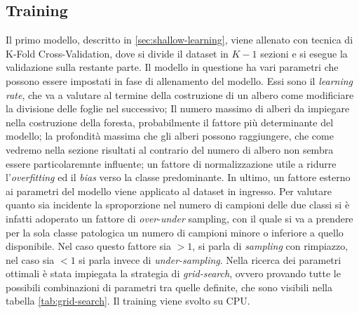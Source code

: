 \subsection{Training}

Il primo modello, descritto in \ref{sec:shallow-learning},
viene allenato con tecnica di K-Fold Cross-Validation,
dove si divide il dataset in $K-1$ sezioni e si esegue
la validazione sulla restante parte.
Il modello in questione ha vari parametri che possono
essere impostati in fase di allenamento del modello.
Essi sono il {\it learning rate}, che va a valutare
al termine della costruzione di un albero come modificiare
la divisione delle foglie nel successivo;
Il numero massimo di alberi da impiegare nella costruzione
della foresta, probabilmente il fattore più determinante
del modello;
la profondità massima che gli alberi possono raggiungere,
che come vedremo nella sezione risultati al contrario
del numero di albero non sembra essere particolaremnte
influente;
un fattore di normalizzazione utile a ridurre
l'{\it overfitting} ed il {\it bias} verso la classe
predominante.
In ultimo, un fattore esterno ai parametri del modello
viene applicato al dataset in ingresso.
Per valutare quanto sia incidente la sproporzione
nel numero di campioni delle due classi si è infatti
adoperato un fattore di {\it over}-{\it under} sampling,
con il quale si va a prendere per la sola classe patologica
un numero di campioni minore o inferiore a quello disponibile.
Nel caso questo fattore sia $> 1$, si parla di {\it sampling}
con rimpiazzo, nel caso sia $< 1$ si parla invece di
{\it under-sampling}.
Nella ricerca dei parametri ottimali è stata impiegata
la strategia di {\it grid-search}, ovvero provando tutte le
possibili combinazioni di parametri tra quelle definite,
che sono visibili nella tabella \ref{tab:grid-search}.
Il training viene svolto su CPU.


